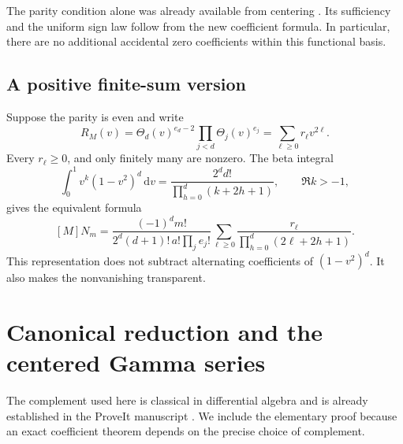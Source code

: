 \documentclass[11pt,letterpaper]{article}
\numberwithin{equation}{section}
\theoremstyle{definition}\newtheorem{definition}[theorem]{Definition}
\theoremstyle{remark}\newtheorem{remark}[theorem]{Remark}
\newcommand{\dd}{\,\mathrm d}\newcommand{\ii}{\mathrm i}
\begin{document}
The parity condition alone was already available from centering
\cite{Manuscript,HTG,Affine}. Its sufficiency and the uniform sign law
follow from the new coefficient formula. In particular, there are no
additional accidental zero coefficients within this functional basis.

\subsection{A positive finite-sum version}
Suppose the parity is even and write
\[
 R_M(v)=\Theta_d(v)^{e_d-2}\prod_{j<d}\Theta_j(v)^{e_j}
                 =\sum_{\ell\ge0}r_\ell v^{2\ell}.
\]
Every $r_\ell\ge0$, and only finitely many are nonzero. The beta integral
\begin{equation}\label{ubg:eq:beta-basic}
 \int_0^1v^{k}(1-v^2)^d\dd v
  =\frac{2^dd!}{\prod_{h=0}^d(k+2h+1)},\qquad \Re k>-1,
\end{equation}
gives the equivalent formula
\begin{equation}\label{ubg:eq:positive-coefficient}
 [M]N_m=
 \frac{(-1)^dm!}{2^d(d+1)!\,a!\prod_j e_j!}
 \sum_{\ell\ge0}\frac{r_\ell}{\prod_{h=0}^d(2\ell+2h+1)}.
\end{equation}
This representation does not subtract alternating coefficients of
$(1-v^2)^d$. It also makes the nonvanishing transparent.

\section{Canonical reduction and the centered Gamma series}
\label{ubg:sec:normal}

The complement used here is classical in differential algebra
\cite[Section 4.4.1]{GRR} and is already established in the ProveIt
manuscript \cite{Manuscript}. We include the elementary proof because
an exact coefficient theorem depends on the precise choice of complement.
\end{document}
